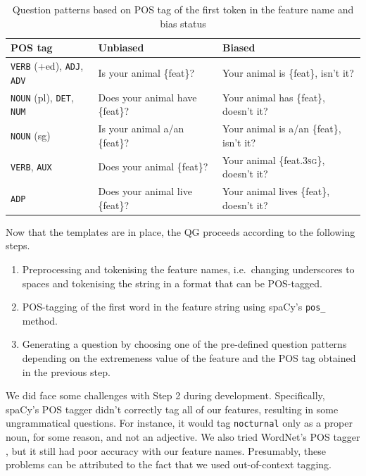 \documentclass[11pt,a4paper]{article}
\begin{document}
\begin{table}[ht]
\centering
	\begin{tabularx}{\linewidth}{lLL}
		\toprule
		POS tag & Unbiased & Biased \\
		\midrule
		\texttt{VERB} (+ed), \texttt{ADJ}, \texttt{ADV} & Is your animal \{feat\}? & Your animal is \{feat\}, isn't it? \\
		\texttt{NOUN} (pl), \texttt{DET}, \texttt{NUM} & Does your animal have \{feat\}? & Your animal has \{feat\}, doesn't it? \\
		\texttt{NOUN} (sg) & Is your animal a/an \{feat\}? & Your animal is a/an \{feat\}, isn't it? \\
		\texttt{VERB}, \texttt{AUX} & Does your animal \{feat\}? & Your animal \{feat.\textsc{3sg}\}, doesn't it? \\
		\texttt{ADP} & Does your animal live \{feat\}? & Your animal lives \{feat\}, doesn't it? \\ 
		\bottomrule
	\end{tabularx}
\caption{Question patterns based on POS tag of the first token in the feature name and bias status}
\label{tab:question_patterns}
\end{table}

Now that the templates are in place, the QG proceeds according to the following steps.

\begin{enumerate}
  \item Preprocessing and tokenising the feature names, i.e.\ changing underscores to spaces and tokenising the string in a format that can be POS-tagged.
  \item POS-tagging of the first word in the feature string using spaCy's \texttt{pos\_} method.
  \item Generating a question by choosing one of the pre-defined question patterns depending on the extremeness value of the feature and the POS tag obtained in the previous step.
\end{enumerate}

We did face some challenges with Step 2 during development.
Specifically, spaCy's POS tagger didn't correctly tag all of our features, resulting in some ungrammatical questions.
For instance, it would tag \texttt{nocturnal} only as a proper noun, for some reason, and not an adjective.
We also tried WordNet's POS tagger \citep{Fellbaum2010}, but it still had poor accuracy with our feature names. 
Presumably, these problems can be attributed to the fact that we used out-of-context tagging.
\end{document}
